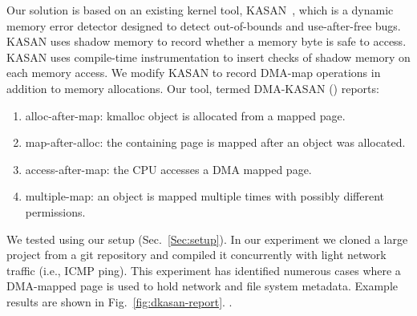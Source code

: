 Our solution is based on an existing kernel tool, KASAN~\cite{kasan}, which is a dynamic memory error detector designed to detect out-of-bounds and use-after-free bugs. KASAN uses shadow memory to record whether a memory byte is safe to access. KASAN uses compile-time instrumentation to insert checks of shadow memory on each memory access. 
We modify KASAN to record DMA-map operations in addition to memory allocations. Our tool, termed DMA-KASAN (\dkasan) reports: 
\begin{enumerate}
    \item alloc-after-map:  kmalloc object is allocated from a mapped page.
    \item map-after-alloc:  the containing page is mapped after an object was allocated.
    \item access-after-map: the CPU accesses a DMA mapped page.
    \item multiple-map: an object is mapped multiple times with possibly different permissions.
\end{enumerate}
We tested \dkasan using our setup (Sec.~\ref{Sec:setup}).
In our experiment we cloned a large project from a git repository and compiled it concurrently with light network traffic (i.e., ICMP ping). This experiment has identified numerous cases where a DMA-mapped page is used to hold network and file system metadata. Example results are shown in Fig.~\ref{fig:dkasan-report}. \DIFdelbegin {}\DIFdelend \DIFaddbegin {}\DIFaddend .

